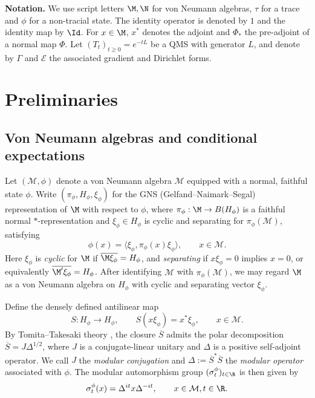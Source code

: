 \documentclass[sn-mathphys-num]{sn-jnl}
\begin{document}
\textbf{Notation.}
We use script letters $\M,\N$ for von Neumann algebras, $\tau$ for a trace and $\phi$ for a non-tracial state.
The identity operator is denoted by $1$ and the identity map by $\Id$.
For $x\in\M$, $x^*$ denotes the adjoint and $\Phi_*$ the pre-adjoint of a normal map $\Phi$.
Let $(T_t)_{t\ge0}=e^{-tL}$ be a QMS with generator
$L$,
and denote by $\Gamma$ and $\mathscr E$ the associated gradient and Dirichlet forms.


\section{Preliminaries}\label{sec:preliminaries}

\subsection{Von Neumann algebras and conditional expectations}\label{sec:von-neumann-algebras}
Let $(\mathcal{M},\phi)$ denote a von Neumann algebra $\mathcal{M}$ equipped with a normal, faithful state $\phi$.
Write $(\pi_\phi,H_\phi,\xi_\phi)$ for the GNS (Gelfand--Naimark--Segal) representation of $\M$ with respect to $\phi$, where $\pi_\phi:\M\to B(H_\phi)$ is a faithful normal $*$-representation and $\xi_\phi\in H_{\phi}$ is cyclic and separating for $\pi_\phi(\mathcal{M})$, satisfying
\[
  \phi(x)=\langle \xi_\phi,\pi_\phi(x) \xi_\phi\rangle ,\qquad x\in\mathcal{M}.
\]
Here $\xi_\phi$ is \emph{cyclic} for $\M$ if $\overline{\M\xi_\phi}=H_\phi$, and \emph{separating} if $x\xi_\phi=0$ implies $x=0$, or equivalently $\overline{\M'\xi_\phi}=H_\phi$.
After identifying $\mathcal{M}$ with $\pi_\phi(\mathcal{M})$, we may regard $\M$ as a von Neumann algebra on $H_\phi$ with cyclic and separating vector $\xi_\phi$.

Define the densely defined antilinear map
\[
  S: H_\phi\to H_\phi,\qquad S(x \xi_\phi)=x^* \xi_\phi,\qquad x\in\mathcal{M}.
\]
By Tomita--Takesaki theory \cite{takesaki_theory_2003-2}, the closure $\overline{S}$ admits the polar decomposition $\overline{S}=J \Delta^{1/2}$, where $J$ is a conjugate-linear unitary and $\Delta$ is a positive self-adjoint operator. We call
$J$ the \emph{modular conjugation} and $\Delta:=\overline{S}^*\overline{S}$ the \emph{modular operator} associated with $\phi$.
The modular automorphism group $(\sigma_t^\phi)_{t\in\R}$ is then given by
\begin{equation}\label{eq:modular-group}
      \sigma_t^\phi(x)=\Delta^{it} x \Delta^{-it},\qquad x\in\mathcal{M},  t\in\R.
\end{equation}
\end{document}
